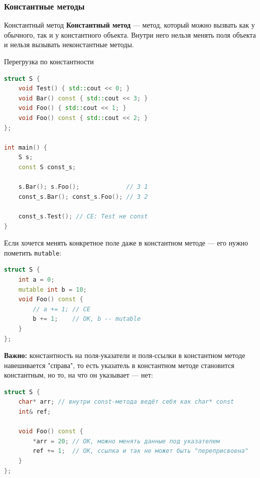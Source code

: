 \subsubsection{Константные методы}
\begin{definition}{Константный метод}{}
\textbf{Константный метод} --- метод, который можно вызвать как у обычного, так и у константного объекта. Внутри него нельзя менять поля объекта и нельзя вызывать неконстантные методы.
\end{definition}
\begin{implementation}{Перегрузка по константности}{}
\begin{lstlisting}[language=C++]
struct S {
    void Test() { std::cout << 0; }
    void Bar() const { std::cout << 3; }
    void Foo() { std::cout << 1; }
    void Foo() const { std::cout << 2; }
};

int main() {
    S s;
    const S const_s;

    s.Bar(); s.Foo();             // 3 1
    const_s.Bar(); const_s.Foo(); // 3 2

    const_s.Test(); // CE: Test не const
}
\end{lstlisting}
\end{implementation}
Если хочется менять конкретное поле даже в константном методе --- его нужно пометить \texttt{mutable}:
\begin{lstlisting}[language=C++]
struct S {
    int a = 0;
    mutable int b = 10;
    void Foo() const {
        // a += 1; // CE
        b += 1;    // OK, b -- mutable
    }
};
\end{lstlisting}
\textbf{Важно:} константность на поля-указатели и поля-ссылки в константном методе навешивается "справа", то есть указатель в константном методе становится константным, но то, на что он указывает --- нет:
\begin{lstlisting}[language=C++]
struct S {
    char* arr; // внутри const-метода ведёт себя как char* const
    int& ref;

    void Foo() const {
        *arr = 20; // OK, можно менять данные под указателем
        ref += 1;  // OK, ссылка и так не может быть "переприсвоена"
    }
};
\end{lstlisting}
